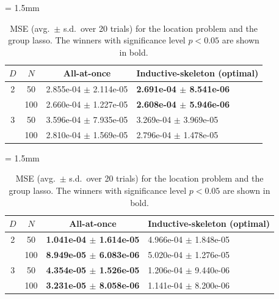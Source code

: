 \documentclass{article}
\begin{document}
\begin{table}[h]
\caption{MSE (avg.\ $\pm$ s.d.\ over 20 trials) for the location problem and the group lasso. The winners with significance level $p < 0.05$ are shown in bold.}
\label{tab:MSE-MOP-instances}
\begin{minipage}[t]{.5\textwidth}
    \centering
    \scriptsize
    {\tabcolsep = 1.5mm
    \begin{tabular}{ccll}
    \toprule
$D$&$N$ & \multicolumn{1}{c}{All-at-once} & \multicolumn{1}{c}{Inductive-skeleton (optimal)}\\ \midrule
2&50	&2.855e-04 $\pm$	2.114e-05	&\textbf{2.691e-04 $\pm$	8.541e-06}\\
&100 &2.660e-04 $\pm$	1.227e-05	&\textbf{2.608e-04 $\pm$	5.946e-06}\\ \midrule
3&50	&3.596e-04 $\pm$	7.935e-05	&3.269e-04 $\pm$	3.969e-05\\ 
&100	&2.810e-04 $\pm$	1.569e-05	&2.796e-04 $\pm$	1.478e-05\\
\bottomrule
    \end{tabular}
    }
    \label{tab:location-problem}
\end{minipage}
\begin{minipage}[t]{.5\textwidth}
    \centering
    \scriptsize
    {\tabcolsep = 1.5mm
    \begin{tabular}{ccll}
    \toprule
$D$&$N$ & \multicolumn{1}{c}{All-at-once} & \multicolumn{1}{c}{Inductive-skeleton (optimal)}\\ \midrule
2&50	&\textbf{1.041e-04 $\pm$	 1.614e-05}	&4.966e-04 $\pm$	1.848e-05\\
& 100 &\textbf{8.949e-05 $\pm$	6.083e-06}	&5.020e-04 $\pm$	1.276e-05\\ \midrule
3&50	&\textbf{4.354e-05 $\pm$	 1.526e-05}	&1.206e-04 $\pm$ 	9.440e-06\\
& 100 &\textbf{3.231e-05 $\pm$	8.058e-06}	&1.141e-04 $\pm$	8.200e-06\\
 \bottomrule
    \end{tabular}
    }
    \label{tab:group-lasso}
\end{minipage}
\end{table}
\end{document}
